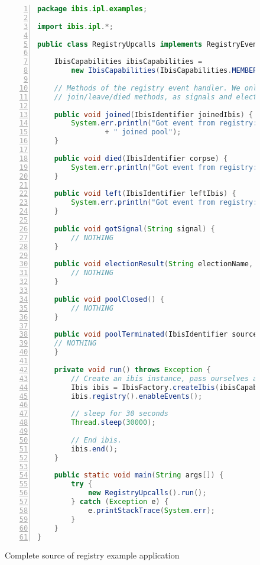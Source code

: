 \begin{figure}[p]
\lstset{basicstyle=\footnotesize,breaklines=false}
\begin{lstlisting}[language=Java,numbers=left, numbersep=3pt]
package ibis.ipl.examples;

import ibis.ipl.*;

public class RegistryUpcalls implements RegistryEventHandler {

    IbisCapabilities ibisCapabilities =
        new IbisCapabilities(IbisCapabilities.MEMBERSHIP_TOTALLY_ORDERED);
    
    // Methods of the registry event handler. We only implement the 
    // join/leave/died methods, as signals and elections are disabled
    
    public void joined(IbisIdentifier joinedIbis) {
        System.err.println("Got event from registry: " + joinedIbis
                + " joined pool");
    }

    public void died(IbisIdentifier corpse) {
        System.err.println("Got event from registry: " + corpse + " died!");
    }

    public void left(IbisIdentifier leftIbis) {
        System.err.println("Got event from registry: " + leftIbis + " left");
    }

    public void gotSignal(String signal) {
        // NOTHING
    }

    public void electionResult(String electionName, IbisIdentifier winner) {
        // NOTHING
    }

    public void poolClosed() {
        // NOTHING
    }

    public void poolTerminated(IbisIdentifier source) {
	// NOTHING
    }

    private void run() throws Exception {
        // Create an ibis instance, pass ourselves as the event handler
        Ibis ibis = IbisFactory.createIbis(ibisCapabilities, this);
        ibis.registry().enableEvents();

        // sleep for 30 seconds
        Thread.sleep(30000);

        // End ibis.
        ibis.end();
    }

    public static void main(String args[]) {
        try {
            new RegistryUpcalls().run();
        } catch (Exception e) {
            e.printStackTrace(System.err);
        }
    }
}
\end{lstlisting}
\caption{Complete source of registry example application}
\label{registry_source}
\end{figure}

